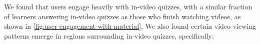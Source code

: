 \documentclass{sigchi}
\begin{document}
We found that users engage heavily with in-video quizzes, with a similar fraction of learners answering in-video quizzes as those who finish watching videos, as shown in \autoref{fig:user-engagement-with-material}. We also found certain video viewing patterns emerge in regions surrounding in-video quizzes, specifically: %

\end{document}
